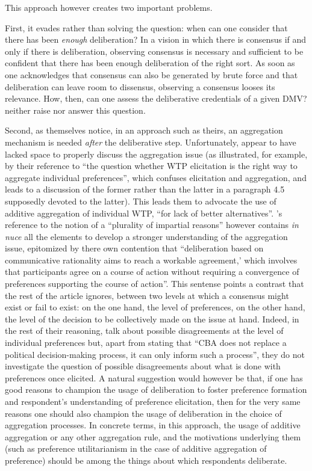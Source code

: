 \documentclass[smallextended,nospthms,natbib]{svjour3}
\begin{document}
This approach however creates two important problems.

First, it evades rather than solving the question: when can one consider that there has been \emph{enough} deliberation? In a vision in which there is consensus if and only if there is deliberation, observing consensus is necessary and sufficient to be confident that there has been enough deliberation of the right sort. As soon as one acknowledges that consensus can also be generated by brute force and that deliberation can leave room to dissensus, observing a consensus looses its relevance. How, then, can one assess the deliberative credentials of a given DMV? \citet{bartkowski_beyond_2018} neither raise nor answer this question.

Second, as \citet{bartkowski_beyond_2018} themselves notice, in an approach such as theirs, an aggregation mechanism is needed \emph{after} the deliberative step. Unfortunately, \citet{bartkowski_beyond_2018} appear to have lacked space to properly discuss the aggregation issue (as illustrated, for example, by their reference to ``the question whether WTP elicitation is the right way to aggregate individual preferences'', which confuses elicitation and aggregation, and leads to a discussion of the former rather than the latter in a paragraph 4.5 supposedly devoted to the latter). This leads them to advocate the use of additive aggregation of individual WTP, ``for lack of better alternatives''. \citet{bartkowski_beyond_2018}'s reference to the notion of a ``plurality of impartial reasons'' however contains \emph{in nuce} all the elements to develop a stronger understanding of the aggregation issue, epitomized by there own contention that ``deliberation based on communicative rationality aims to reach a workable agreement,’ which involves that participants agree on a course of action without requiring a convergence of preferences supporting the course of action\citep{dryzek_deliberative_2002}''. This sentense points a contrast that the rest of the article ignores, between two levels at which a consensus might exist or fail to exist: on the one hand, the level of preferences, on the other hand, the level of the decision to be collectively made on the issue at hand. Indeed, in the rest of their reasoning, \citet{bartkowski_beyond_2018} talk about possible disagreements at the level of individual preferences but, apart from stating that ``CBA  does not replace a political decision-making process, it can only inform such a process'', they do not investigate the question of possible disagreements about what is done with preferences once elicited. A natural suggestion would however be that, if one has good reasons to champion the usage of deliberation to foster preference formation and respondent's understanding of preference elicitation, then for the very same reasons one should also champion the usage of deliberation in the choice of aggregation processes. In concrete terms, in this approach, the usage of additive aggregation or any other aggregation rule, and the motivations underlying them (such as preference utilitarianism in the case of additive aggregation of preference) should be among the things about which respondents deliberate.
\end{document}
